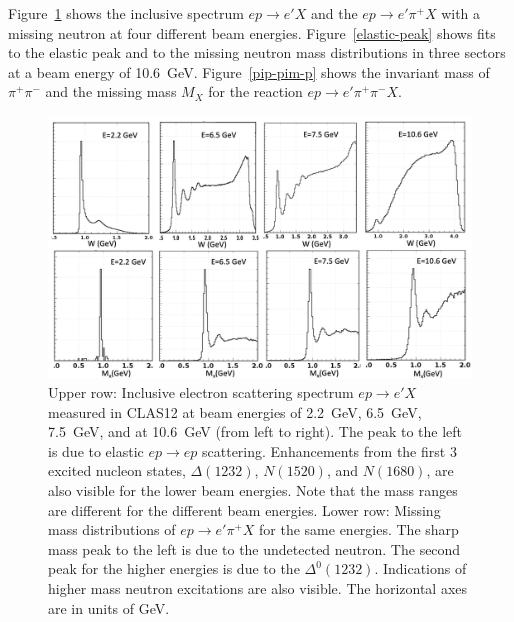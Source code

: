\documentclass[final,3p,twocolumn]{elsarticle}
\begin{document}
Figure~\ref{spectrum} shows the inclusive spectrum $ep \to e' X$ and the $ep \to e' \pi^+ X$ with a missing
neutron at four different beam energies. Figure~\ref{elastic-peak} shows fits to the elastic peak and to the
missing neutron mass distributions in three sectors at a beam energy of 10.6~GeV. Figure~\ref{pip-pim-p} shows
the invariant mass of $\pi^+\pi^-$ and the missing mass $M_X$ for the reaction $ep \to e' \pi^+ \pi^- X$.  

\begin{figure}[ht]
\centerline{\includegraphics[width=1.8\columnwidth]{W-spectrum.png}}
\caption{Upper row: Inclusive electron scattering spectrum $ep \to e' X$ measured in CLAS12 at beam energies 
of 2.2~GeV, 6.5~GeV, 7.5~GeV, and at 10.6~GeV (from left to right). The peak to the left is due to elastic $ep \to ep$
scattering. Enhancements from the first 3 excited nucleon states, $\Delta(1232)$, $N(1520)$, and $N(1680)$, are also
visible for the lower beam energies. Note that the mass ranges  are different for the different beam energies. Lower
row:  Missing mass distributions of $ep\to e' \pi^+X$ for the same energies. The sharp mass peak to the left is due
to the undetected neutron. The second peak for the higher energies is due to the $\Delta^0(1232)$. Indications of higher
mass neutron excitations are also visible. The horizontal axes are in units of GeV. } 
\label{spectrum}
\end{figure} 
\end{document}
